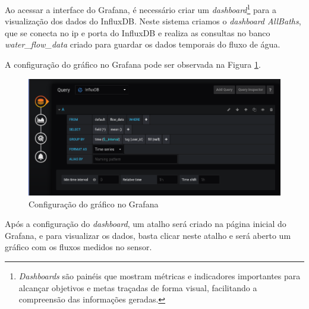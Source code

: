 Ao acessar a interface do Grafana, é necessário criar um \textit{dashboard}\footnote{\textit{Dashboards} são painéis que mostram métricas e indicadores importantes para alcançar objetivos e metas traçadas de forma visual, facilitando a compreensão das informações geradas.} para a visualização dos dados do InfluxDB. Neste sistema criamos o \textit{dashboard AllBaths}, que se conecta no ip e porta do InfluxDB e realiza as consultas no banco \textit{water\_flow\_data} criado para guardar os dados temporais do fluxo de água.

A configuração do gráfico no Grafana pode ser observada na Figura \ref{fig:grafanaconf}.

\begin{figure}[htbp]
	\centering
	\includegraphics[width=1\linewidth]{figuras/grafanaconf.png}
	\caption{Configuração do gráfico no Grafana}
	\label{fig:grafanaconf}
\end{figure}

Após a configuração do \textit{dashboard}, um atalho será criado na página inicial do Grafana, e para visualizar os dados, basta clicar neste atalho e será aberto um gráfico com os fluxos medidos no sensor.

